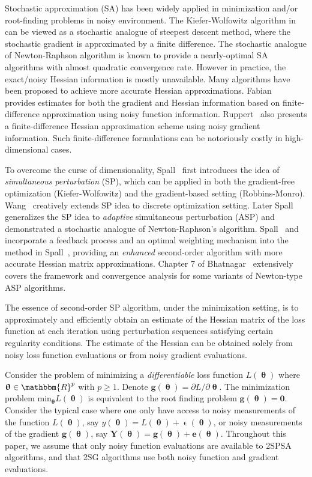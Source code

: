 \documentclass[conference,10.6cpt]{IEEEtran}
\begin{document}
Stochastic approximation (SA) has been widely applied in minimization and/or
root-finding problems in noisy environment. The Kiefer-Wolfowitz algorithm in \cite{Kiefer1952} can be viewed as a stochastic analogue of steepest descent method, where the stochastic gradient is approximated by a finite difference. The stochastic analogue of Newton-Raphson algorithm is known to provide a nearly-optimal SA algorithms with almost quadratic convergence rate. However in practice, the exact/noisy Hessian information is mostly unavailable. Many algorithms have been proposed to achieve more accurate Hessian approximations. Fabian~\cite{Fabian1971} provides estimates for both the gradient and Hessian information based on finite-difference approximation using noisy function information. Ruppert~\cite{Ruppert1985} also presents a finite-difference Hessian approximation scheme using noisy gradient information. Such finite-difference formulations can be notoriously costly in high-dimensional cases. 

To overcome the curse of dimensionality, Spall~\cite{Spall1992} first introduces the idea of \textit{simultaneous perturbation} (SP), which can be applied
in both the gradient-free optimization (Kiefer-Wolfowitz) and the
gradient-based setting (Robbins-Monro).  Wang~\cite{Wang2011} creatively extends SP idea to discrete optimization setting. Later Spall~\cite{Spall2000}
generalizes the SP idea to \textit{adaptive} simultaneous perturbation (ASP) and demonstrated a stochastic
analogue of Newton-Raphson's algorithm.  Spall~\cite{Spall2007} and \cite{Spall2009} incorporate a feedback process and an optimal weighting mechanism into the method in Spall~\cite{Spall2000}, providing an
\textit{enhanced} second-order algorithm with more accurate Hessian matrix approximations. Chapter 7 of Bhatnagar~\cite{Bhatnagar2012} extensively covers the framework and convergence analysis for some variants of Newton-type ASP algorithms.

The essence of second-order SP algorithm, under the minimization setting,
is to approximately and efficiently obtain an estimate of the
Hessian matrix of the loss function at each
iteration using perturbation sequences satisfying certain regularity
conditions. The estimate of the Hessian can be obtained solely from
noisy loss function evaluations or from noisy gradient
evaluations.

Consider the problem of minimizing a
\textit{differentiable} loss function $ L(\bm{\uptheta}) $ where
$ \bm{\uptheta} \in \mathbbm{R}^p $ with $ p\ge1 $. Denote
$\bm{g}(\bm{\uptheta})={\partial L}/{\partial \bm{\uptheta}}$. The
minimization problem ${\text{min}}_{\bm{\uptheta}}L(\bm{\uptheta})$ is
equivalent to the root finding problem $\bm{g}(\bm{\uptheta})=\bm{0}$.
Consider the typical case where one only have access to noisy measurements of
the function $ L(\bm{\uptheta}) $, say
$ y(\bm{\uptheta})=L(\bm{\uptheta})+\upvarepsilon(\bm{\uptheta}) $, or
noisy measurements of the gradient $\bm{g}(\bm{\uptheta})$, say
$\bm{Y}(\bm{\uptheta})=\bm{g}(\bm{\uptheta})+\bm{e}(\bm{\uptheta})$. Throughout this paper, we assume that only noisy function
evaluations are available to 2SPSA algorithms, and that 2SG algorithms use both noisy function and gradient evaluations.
\end{document}
